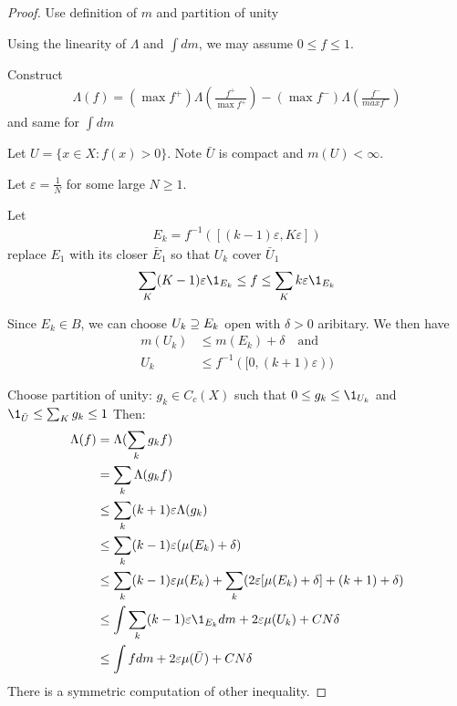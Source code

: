 \begin{proof}
	Use definition of $m$ and partition of unity

	Using the linearity of $\Lambda$ and  $\int dm$, we may assume $0 \leq f \leq 1.$

	Construct 
	 \begin{align*}
	    \Lambda (f) = ( \max f^+ ) \Lambda \left(\frac{f^+}{\max f^+}\right) - (\max f^- ) \Lambda \left(\frac{f^-}{max f^-} \right)
	\end{align*} 
	and same for $\int dm$


	Let $U = \{x \in X : f(x) > 0\}$. Note  $\bar{U}$ is compact and $m(U) < \infty$.

	Let  $\varepsilon = \frac{1}{N}$ for some large  $N \geq 1$.

	Let
	\begin{align*}
		E_k = f^{-1}\left( [ (k-1) \varepsilon, K \varepsilon]\right)
	\end{align*}
	replace $E_1$ with its closer $\bar{E}_1$ so that $U_k$ cover $\bar{U}_1$
	 \begin{align*}
	\sum_{K} (K -1) \varepsilon \1_{E_k} \leq f \leq \sum_{K} k \varepsilon \1_{E_k}
	\end{align*} 

	Since $E_k \in B$, we can choose $U_k \supseteq E_k$ open with $\delta >0 $ aribitary.
	We then have
	\begin{align*}
		m(U_k) &\leq m(E_k) + \delta \quad \text{and} \\
		U_k &\leq f^{-1} ( [ 0, (k+1)\varepsilon))
	\end{align*} 

	Choose partition of unity: $g_k \in C_c(X)$ such that  $0 \leq g_k \leq \1_{U_k}$ and \\
	$\1_{\bar{U}} \leq \sum_{K} g_k \leq 1$ 
	Then:
	\begin{align*}
	\Lambda(f) &= \Lambda( \sum_{k} g_k f) \\
			   &=  \sum_{k} \Lambda( g_k f) \\
			   &\leq  \sum_{k} (k+1) \varepsilon \Lambda( g_k ) \\
			   &\leq  \sum_{k} (k-1) \varepsilon ( \mu( E_k ) + \delta ) \\
			   &\leq \sum_{k} (k-1) \varepsilon \mu( E_k ) + \sum_{k} (2 \varepsilon [ \mu (E_k) + \delta] + (k+1) + \delta) \\
			   &\leq \int \sum_{k} (k-1) \varepsilon \1_{E_k} dm + 2 \varepsilon  \mu( U_k ) + C N \delta  \\
			   &\leq \int f dm + 2 \varepsilon  \mu(\bar{U}) + C N \delta  \\
	\end{align*} There is a symmetric computation of other inequality.
\end{proof}




